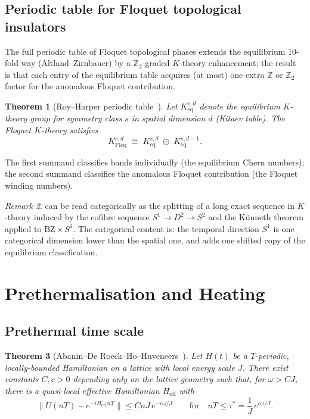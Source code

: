 \documentclass[12pt]{article}
\newtheorem{theorem}{Theorem}[section]
\theoremstyle{definition}
\theoremstyle{remark}
\newtheorem{remark}[theorem]{Remark}
\newcommand{\Z}{\mathbb{Z}}
\newcommand{\Heff}{H_{\mathrm{eff}}}
\begin{document}
\subsection{Periodic table for Floquet topological insulators}

The full periodic table of Floquet topological phases extends the equilibrium $10$-fold way (Altland--Zirnbauer) by a $\Z_2$-graded $K$-theory enhancement; the result~\cite{roy2017} is that each entry of the equilibrium table acquires (at most) one extra $\Z$ or $\Z_2$ factor for the anomalous Floquet contribution.

\begin{theorem}[Roy--Harper periodic table~\cite{roy2017}]
\label{thm:roy-harper}
Let $K_{\mathrm{eq}}^{s,d}$ denote the equilibrium $K$-theory group for symmetry class $s$ in spatial dimension $d$ (Kitaev table). The Floquet $K$-theory satisfies
\begin{equation}
K_{\mathrm{Floq}}^{s,d} \;\cong\; K_{\mathrm{eq}}^{s,d}\;\oplus\;K_{\mathrm{eq}}^{s,d-1}.
\end{equation}
\end{theorem}

The first summand classifies bands individually (the equilibrium Chern numbers); the second summand classifies the anomalous Floquet contribution (the Floquet winding numbers).

\begin{remark}
 can be read categorically as the splitting of a long exact sequence in $K$-theory induced by the cofibre sequence $S^1\to D^2\to S^2$ and the K\"unneth theorem applied to $\mathrm{BZ}\times S^1$. The categorical content is: the temporal direction $S^1$ is one categorical dimension lower than the spatial one, and adds one shifted copy of the equilibrium classification.
\end{remark}

\section{Prethermalisation and Heating}
\label{sec:prethermal}

\subsection{Prethermal time scale}

\begin{theorem}[Abanin--De Roeck--Ho--Huveneers~\cite{abanin2015}]
\label{thm:abanin}
Let $H(t)$ be a $T$-periodic, locally-bounded Hamiltonian on a lattice with local energy scale $J$. There exist constants $C,c>0$ depending only on the lattice geometry such that, for $\omega>CJ$, there is a quasi-local effective Hamiltonian $\Heff$ with
\begin{equation}
\bigl\|U(nT)-e^{-i\Heff\,nT}\bigr\| \leq C n J\,e^{-c\omega/J}\qquad\text{for}\quad nT\leq\tau^*=\frac{1}{J}\,e^{c\omega/J}.
\end{equation}
\end{theorem}
\end{document}
